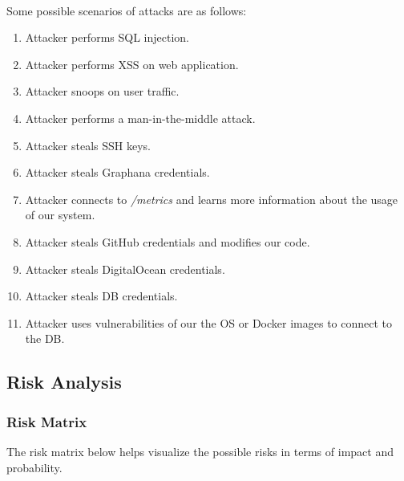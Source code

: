 \paragraph{} Some possible scenarios of attacks are as follows:
\begin{enumerate}
	\item Attacker performs SQL injection. %
	\item Attacker performs XSS on web application.%
	\item Attacker snoops on user traffic.%
	\item Attacker performs a man-in-the-middle attack.%
	\item Attacker steals SSH keys.%
	\item Attacker steals Graphana credentials.%
	\item Attacker connects to \textit{/metrics} and learns more information about the usage of our system.
	\item Attacker steals GitHub credentials and modifies our code.%
	\item Attacker steals DigitalOcean credentials.%
	\item Attacker steals DB credentials.%
	\item Attacker uses vulnerabilities of our the OS or Docker images to connect to the DB.%
\end{enumerate}

\subsection{Risk Analysis}
\subsubsection{Risk Matrix}
The risk matrix below helps visualize the possible risks in terms of impact and probability. %

